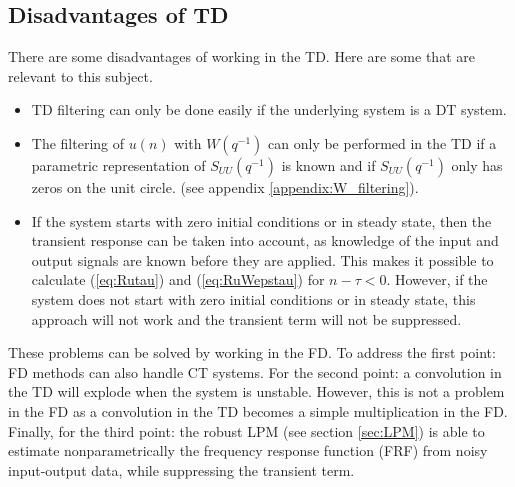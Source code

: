 \subsection{Disadvantages of TD}
There are some disadvantages of working in the TD. Here are some that are relevant to this subject.
\begin{itemize}
    \item TD filtering can only be done easily if the underlying system is a DT system.
    \item The filtering of $u(n)$ with $W(q^{-1})$ can only be performed in the TD if a parametric representation of $S_{UU}(q^{-1})$ is known and if $S_{UU}(q^{-1})$ only has zeros on the unit circle. (see appendix \ref{appendix:W_filtering}).
    \item If the system starts with zero initial conditions or in steady state, then the transient response can be taken into account, as knowledge of the input and output signals are known before they are applied. This makes it possible to calculate (\ref{eq:Rutau}) and (\ref{eq:RuWepstau}) for $n-\tau < 0$. However, if the system does not start with zero initial conditions or in steady state, this approach will not work and the transient term will not be suppressed.
\end{itemize}
These problems can be solved by working in the FD. To address the first point: FD methods can also handle CT systems. For the second point: a convolution in the TD will explode when the system is unstable. However, this is not a problem in the FD as a convolution in the TD becomes a simple multiplication in the FD. Finally, for the third point: the robust LPM (see section \ref{sec:LPM}) is able to estimate nonparametrically the frequency response function (FRF) from noisy input-output data, while suppressing the transient term.




